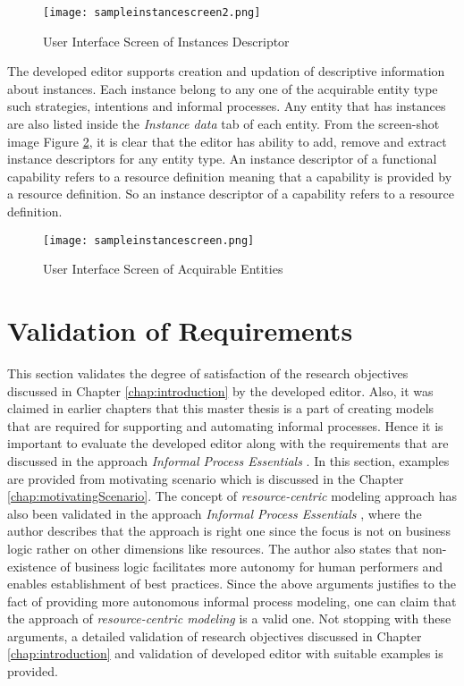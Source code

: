 \begin{figure}
	\centering
	\texttt{[image: sampleinstancescreen2.png]}
	\caption{User Interface Screen of Instances Descriptor}
	\label{fig:realizationofinstances2}
\end{figure}

The developed editor supports creation and updation of descriptive information about instances. Each instance belong to any one of the acquirable entity type such strategies, intentions and informal processes. Any entity that has instances are also listed inside the \textit{Instance data} tab of each entity. From the screen-shot image Figure \ref{fig:realizationofinstances}, it is clear that the editor has ability to add, remove and extract instance descriptors for any entity type. An instance descriptor of a functional capability refers to a resource definition meaning that a capability is provided by a resource definition. So an instance descriptor of a capability refers to a resource definition.

\begin{figure}
	\centering
	\texttt{[image: sampleinstancescreen.png]}
	\caption{User Interface Screen of Acquirable Entities}
	\label{fig:realizationofinstances}
\end{figure}

		
\section{Validation of Requirements}
\label{sec:validation}
This section validates the degree of satisfaction of the research objectives discussed in Chapter \ref{chap:introduction} by the developed editor. Also, it was claimed in earlier chapters that this master thesis is a part of creating models that are required for supporting and automating informal processes. Hence it is important to evaluate the developed editor along with the requirements that are discussed in the approach \textit{Informal Process Essentials} \cite{Sungur2014a}. In this section, examples are provided from motivating scenario which is discussed in the Chapter \ref{chap:motivatingScenario}. The concept of \textit{resource-centric} modeling approach has also been validated in the approach \textit{Informal Process Essentials} \cite{Sungur2014a}, where the author describes that the approach is right one since the focus is not on business logic rather on other dimensions like resources. The author also states that non-existence of business logic facilitates more autonomy for human performers and enables establishment of best practices. Since the above arguments justifies to the fact of providing more autonomous informal process modeling, one can claim that the approach of \textit{resource-centric modeling} is a valid one. Not stopping with these arguments, a detailed validation of research objectives discussed in Chapter \ref{chap:introduction} and validation of developed editor with suitable examples is provided.
		

